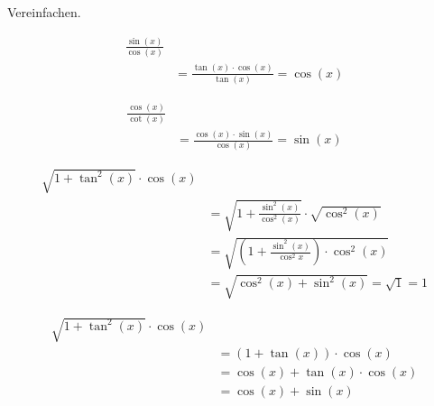 \begin{uebung}
    Vereinfachen.

    \begin{align*}
        \frac{\sin(x)}{\cos(x)} \\
        &= \frac{\tan(x) \cdot \cos(x)}{\tan(x)} = \cos(x)
    \end{align*}
    
    \begin{align*}
        \frac{\cos(x)}{\cot(x)} \\
        &= \frac{\cos(x) \cdot \sin(x)}{\cos(x)} = \sin(x)
    \end{align*}

    \begin{align*}
        \sqrt{1+ \tan^2(x)} \cdot \cos(x) \\
        &= \sqrt{1 + \frac{\sin^2(x)}{\cos^2(x)}} \cdot \sqrt{\cos^2(x)} \\
        &= \sqrt{\left(1 + \frac{\sin^2(x)}{\cos^2{x}} \right) \cdot \cos^2(x)} \\
        &= \sqrt{\cos^2(x) + \sin^2(x)} = \sqrt{1} = 1
    \end{align*}

    \begin{align*}
        \sqrt{1 + \tan^2(x)} \cdot \cos(x) \\
        &= (1 + \tan(x)) \cdot \cos(x) \\
        &= \cos(x) + \tan(x) \cdot \cos(x) \\
        &= \cos(x) + \sin(x) 
    \end{align*}

\end{uebung}
